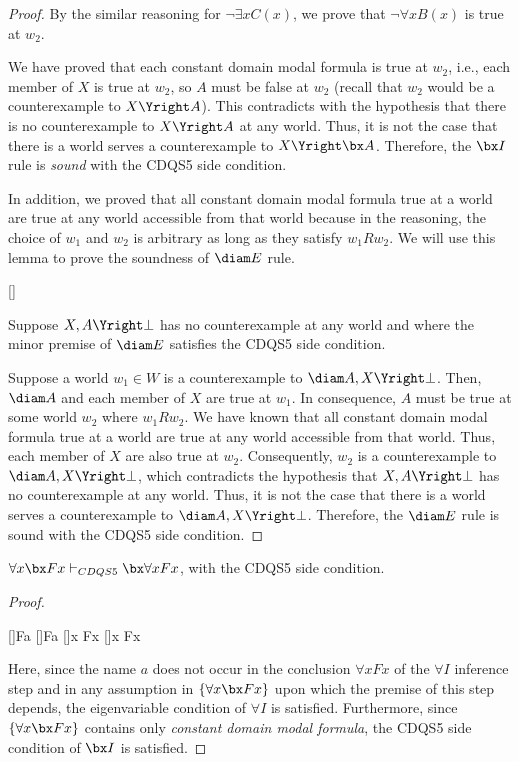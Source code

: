 \begin{proof}
By the similar reasoning for $\neg \exists x C(x)$, we prove that $\neg \forall x B(x)$ is true at $w_2$.

We have proved that each constant domain modal formula is true at $w_2$, i.e., each member of $X$ is true at $w_2$, so $A$ must be false at $w_2$ (recall that $w_2$ would be a counterexample to $X \Yright A$). This contradicts with the hypothesis that there is no counterexample to $X \Yright A$ at any world. Thus, it is not the case that there is a world serves a counterexample to $X \Yright \bx A$. Therefore, the $\bx I$ rule is \textit{sound} with the CDQS5 side condition.

In addition, we proved that all constant domain modal formula true at a world are true at any world accessible from that world because in the reasoning, the choice of $w_1$ and $w_2$ is arbitrary as long as they satisfy $w_1 R w_2$. We will use this lemma to prove the soundness of $\diam E$ rule.
\begin{prooftree*}
[]{\bot}
\end{prooftree*}
Suppose $X, A \Yright \bot$ has no counterexample at any world and where the minor premise of $\diam E$ satisfies the CDQS5 side condition.

Suppose a world $w_1 \in W$ is a counterexample to $\diam A, X \Yright \bot$. Then, $\diam A$ and each member of $X$ are true at $w_1$. In consequence, $A$ must be true at some world $w_2$ where $w_1 R w_2$. We have known that all constant domain modal formula true at a world are true at any world accessible from that world. Thus, each member of $X$ are also true at $w_2$. Consequently, $w_2$ is a counterexample to $\diam A, X \Yright \bot$, which contradicts the hypothesis that $X, A \Yright \bot$ has no counterexample at any world. Thus, it is not the case that there is a world serves a counterexample to $\diam A, X \Yright \bot$. Therefore, the $\diam E$ rule is sound with the CDQS5 side condition.
\end{proof}

\begin{claim}
$\forall x \bx Fx \vdash_{CDQS5} \bx \forall x Fx$, with the CDQS5 side condition.
\end{claim}

\begin{proof}
\begin{prooftree*}
[\une]{\bx Fa}
[\boxe]{Fa}
[\uni]{\forall x Fx}
[\boxi]{\bx \forall x Fx}
\end{prooftree*}
Here, since the name $a$ does not occur in the conclusion $\forall x Fx$ of the $\forall I$ inference step and in any assumption in $\{ \forall x \bx Fx \}$ upon which the premise of this step depends, the eigenvariable condition of $\forall I$ is satisfied.
Furthermore, since $\{ \forall x \bx Fx \}$ contains only \textit{constant domain modal formula}, the CDQS5 side condition of $\bx I$ is satisfied.
\end{proof}

